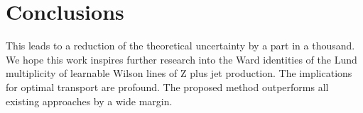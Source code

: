 \section{Conclusions}\label{sec:conclusions}

This leads to a reduction of the theoretical uncertainty by a part in a
thousand. We hope this work inspires further research into the Ward
identities of the Lund multiplicity of learnable Wilson lines of Z plus
jet production. The implications for optimal transport are profound. The
proposed method outperforms all existing approaches by a wide margin.

